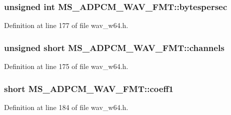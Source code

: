 \subsubsection[{\texorpdfstring{bytespersec}{bytespersec}}]{\setlength{\rightskip}{0pt plus 5cm}unsigned {\bf int} M\+S\+\_\+\+A\+D\+P\+C\+M\+\_\+\+W\+A\+V\+\_\+\+F\+M\+T\+::bytespersec}\hypertarget{struct_m_s___a_d_p_c_m___w_a_v___f_m_t_a7d9c4e0e0f10df646f5a7e6c92a5d316}{}\label{struct_m_s___a_d_p_c_m___w_a_v___f_m_t_a7d9c4e0e0f10df646f5a7e6c92a5d316}


Definition at line 177 of file wav\+\_\+w64.\+h.

\subsubsection[{\texorpdfstring{channels}{channels}}]{\setlength{\rightskip}{0pt plus 5cm}unsigned short M\+S\+\_\+\+A\+D\+P\+C\+M\+\_\+\+W\+A\+V\+\_\+\+F\+M\+T\+::channels}\hypertarget{struct_m_s___a_d_p_c_m___w_a_v___f_m_t_ae1fcd6bb6ca7fa18123911b835f0db7e}{}\label{struct_m_s___a_d_p_c_m___w_a_v___f_m_t_ae1fcd6bb6ca7fa18123911b835f0db7e}


Definition at line 175 of file wav\+\_\+w64.\+h.

\subsubsection[{\texorpdfstring{coeff1}{coeff1}}]{\setlength{\rightskip}{0pt plus 5cm}short M\+S\+\_\+\+A\+D\+P\+C\+M\+\_\+\+W\+A\+V\+\_\+\+F\+M\+T\+::coeff1}\hypertarget{struct_m_s___a_d_p_c_m___w_a_v___f_m_t_a8ce88ab3d02484a576b06d6c9aeccc4b}{}\label{struct_m_s___a_d_p_c_m___w_a_v___f_m_t_a8ce88ab3d02484a576b06d6c9aeccc4b}


Definition at line 184 of file wav\+\_\+w64.\+h.

